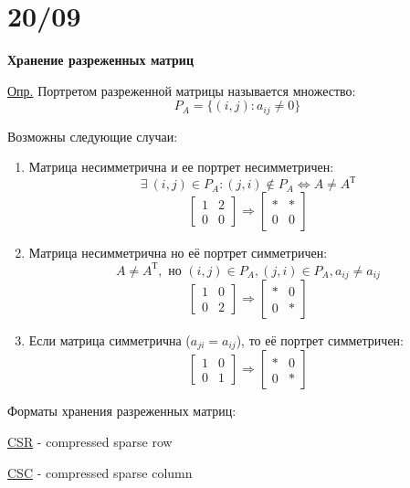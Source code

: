 	\section*{20/09}
	
	\begin{center}
		\textbf{Хранение разреженных матриц}
	\end{center}
	
		\underline{Опр.} Портретом разреженной матрицы называется множество:
		\[
		P_A=\{(i,j):a_{ij}\neq0\}
		\]
		
		Возможны следующие случаи:
		\begin{enumerate}
			\item Матрица несимметрична и ее портрет несимметричен:
			\[
			\exists \ (i, j) \in P_A: (j, i) \notin P_A \Leftrightarrow A\neq A^{\text{Т}}
			\]
			\[
			\begin{bmatrix}
				1&2 \\ 0&0
			\end{bmatrix}
			\Rightarrow 
			\begin{bmatrix}
				\ast&\ast \\ 0&0
			\end{bmatrix}
			\]
			\item Матрица несимметрична но её портрет симметричен:
			\[
			A\neq A^{\text{Т}}, \text{ но } (i, j) \in P_A, (j, i) \in P_A, a_{ij}\neq a_{ij}
			\]
			\[
			\begin{bmatrix}
				1&0 \\ 0&2
			\end{bmatrix}
			\Rightarrow 
			\begin{bmatrix}
				\ast&0 \\ 0&\ast
			\end{bmatrix}
			\]
			\item Если матрица симметрична ($a_{ji}=a_{ij}$), то её портрет симметричен:
			\[
			\begin{bmatrix}
				1&0 \\ 0&1
			\end{bmatrix}
			\Rightarrow 
			\begin{bmatrix}
				\ast&0 \\ 0&\ast
			\end{bmatrix}
			\]
		\end{enumerate}
		
Форматы хранения разреженных матриц:
		
\underline{CSR} - compressed sparse row

\underline{CSC} - compressed sparse column

